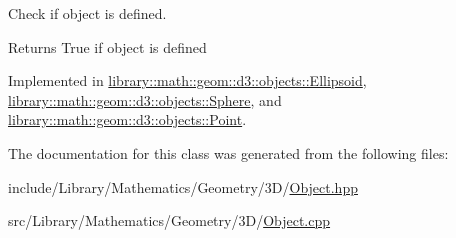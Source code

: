 Check if object is defined. 

\begin{DoxyReturn}{Returns}
True if object is defined 
\end{DoxyReturn}


Implemented in \hyperlink{classlibrary_1_1math_1_1geom_1_1d3_1_1objects_1_1_ellipsoid_adb42c2c7734c27dcb16d947fc5c9d76d}{library\+::math\+::geom\+::d3\+::objects\+::\+Ellipsoid}, \hyperlink{classlibrary_1_1math_1_1geom_1_1d3_1_1objects_1_1_sphere_a0598bd75f8a34e07a3ad36cf10a7f098}{library\+::math\+::geom\+::d3\+::objects\+::\+Sphere}, and \hyperlink{classlibrary_1_1math_1_1geom_1_1d3_1_1objects_1_1_point_a9874289efeb457ada4b32d7eb1e012f6}{library\+::math\+::geom\+::d3\+::objects\+::\+Point}.



The documentation for this class was generated from the following files\+:\begin{DoxyCompactItemize}
\item 
include/\+Library/\+Mathematics/\+Geometry/3\+D/\hyperlink{_object_8hpp}{Object.\+hpp}\item 
src/\+Library/\+Mathematics/\+Geometry/3\+D/\hyperlink{_object_8cpp}{Object.\+cpp}\end{DoxyCompactItemize}

